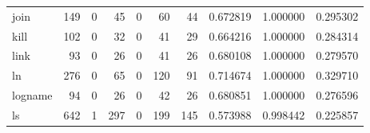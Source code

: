 \begin{longtable}{lrrrrrrrrr}
join      &                                                149 &                                                  0 &                                                 45 &                                                  0 &                                                 60 &                                                 44 &                                           0.672819 &                               1.000000 &                             0.295302 \\
kill      &                                                102 &                                                  0 &                                                 32 &                                                  0 &                                                 41 &                                                 29 &                                           0.664216 &                               1.000000 &                             0.284314 \\
link      &                                                 93 &                                                  0 &                                                 26 &                                                  0 &                                                 41 &                                                 26 &                                           0.680108 &                               1.000000 &                             0.279570 \\
ln        &                                                276 &                                                  0 &                                                 65 &                                                  0 &                                                120 &                                                 91 &                                           0.714674 &                               1.000000 &                             0.329710 \\
logname   &                                                 94 &                                                  0 &                                                 26 &                                                  0 &                                                 42 &                                                 26 &                                           0.680851 &                               1.000000 &                             0.276596 \\
ls        &                                                642 &                                                  1 &                                                297 &                                                  0 &                                                199 &                                                145 &                                           0.573988 &                               0.998442 &                             0.225857 \\

\end{longtable}
